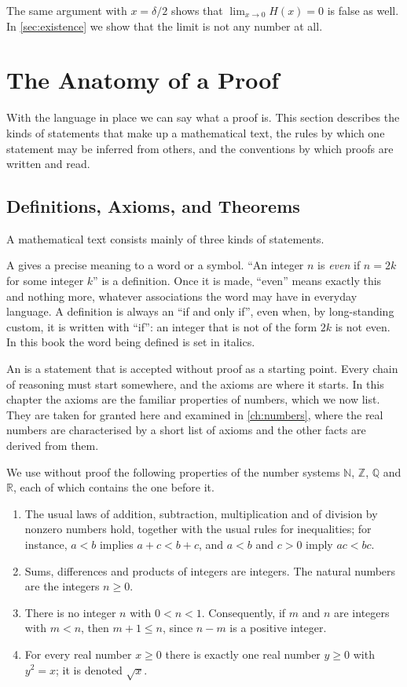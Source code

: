 The same argument with $x=\delta/2$ shows that $\lim_{x\to 0}H(x)=0$ is false as well. In \cref{sec:existence} we show that the limit is not any number at all.

\section{The Anatomy of a Proof}
\label{sec:anatomy}

With the language in place we can say what a proof is. This section describes the kinds of statements that make up a mathematical text, the rules by which one statement may be inferred from others, and the conventions by which proofs are written and read.

\subsection{Definitions, Axioms, and Theorems}

A mathematical text consists mainly of three kinds of statements.

A  gives a precise meaning to a word or a symbol. ``An integer $n$ is \emph{even} if $n=2k$ for some integer $k$'' is a definition. Once it is made, ``even'' means exactly this and nothing more, whatever associations the word may have in everyday language. A definition is always an ``if and only if'', even when, by long-standing custom, it is written with ``if'': an integer that is not of the form $2k$ is not even. In this book the word being defined is set in italics.

An  is a statement that is accepted without proof as a starting point. Every chain of reasoning must start somewhere, and the axioms are where it starts. In this chapter the axioms are the familiar properties of numbers, which we now list. They are taken for granted here and examined in \cref{ch:numbers}, where the real numbers are characterised by a short list of axioms and the other facts are derived from them.

\begin{assumption}
\label{asm:numbers}
We use without proof the following properties of the number systems $\mathbb N$, $\mathbb Z$, $\mathbb Q$ and $\mathbb R$, each of which contains the one before it.
\begin{enumerate}
\item The usual laws of addition, subtraction, multiplication and of division by nonzero numbers hold, together with the usual rules for inequalities; for instance, $a<b$ implies $a+c<b+c$, and $a<b$ and $c>0$ imply $ac<bc$.
\item Sums, differences and products of integers are integers. The natural numbers are the integers $n\ge 0$.
\item There is no integer $n$ with $0<n<1$. Consequently, if $m$ and $n$ are integers with $m<n$, then $m+1\le n$, since $n-m$ is a positive integer.
\item For every real number $x\ge 0$ there is exactly one real number $y\ge 0$ with $y^2=x$; it is denoted $\sqrt x$.
\end{enumerate}
\end{assumption}

